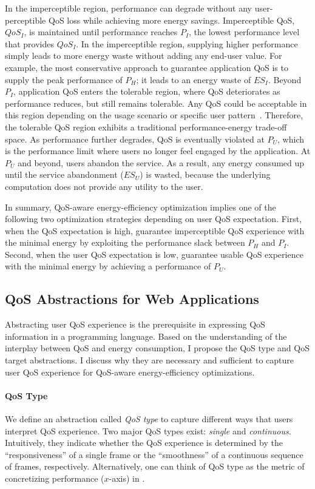 In the imperceptible region, performance can degrade without any user-perceptible QoS loss while achieving more energy savings. Imperceptible QoS, $QoS_I$, is maintained until performance reaches $P_I$, the lowest performance level that provides $QoS_I$. In the imperceptible region, supplying higher performance simply leads to more energy waste without adding any end-user value. For example, the most conservative approach to guarantee application QoS is to supply the peak performance of $P_H$; it leads to an energy waste of $ES_I$. Beyond $P_I$, application QoS enters the tolerable region, where QoS deteriorates as performance reduces, but still remains tolerable. Any QoS could be acceptable in this region depending on the usage scenario or specific user pattern~\cite{usagepattern, satscore}. Therefore, the tolerable QoS region exhibits a traditional performance-energy trade-off space. As performance further degrades, QoS is eventually violated at $P_U$, which is the performance limit where users no longer feel engaged by the application. At $P_U$ and beyond, users abandon the service. As a result, any energy consumed up until the service abandonment ($ES_U$) is wasted, because the underlying computation does not provide any utility to the user.

In summary, QoS-aware energy-efficiency optimization implies one of the following two optimization strategies depending on user QoS expectation. First, when the QoS expectation is high, guarantee imperceptible QoS experience with the minimal energy by exploiting the performance slack between $P_H$ and $P_I$. Second, when the user QoS expectation is low, guarantee usable QoS experience with the minimal energy by achieving a performance of $P_U$.

\subsection{QoS Abstractions for Web Applications}
\label{sec:lang:abst}

Abstracting user QoS experience is the prerequisite in expressing QoS information in a programming language. Based on the understanding of the interplay between QoS and energy consumption, I propose the QoS type and QoS target abstractions. I discuss why they are necessary and sufficient to capture user QoS experience for QoS-aware energy-efficiency optimizations.

\paragraph{QoS Type} We define an abstraction called \textit{QoS type} to capture different ways that users interpret QoS experience. Two major QoS types exist: \textit{single} and \textit{continuous}. Intuitively, they indicate whether the QoS experience is determined by the ``responsiveness'' of a single frame or the ``smoothness'' of a continuous sequence of frames, respectively. Alternatively, one can think of QoS type as the metric of concretizing performance ($x$-axis) in .

